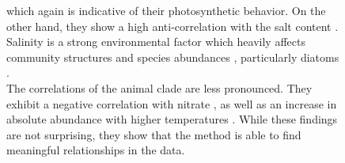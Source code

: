 \begin{figure}[hpbt]
{        which again is indicative of their photosynthetic behavior.
        On the other hand, they show a high anti-correlation
        with the salt content .
        Salinity is a strong environmental factor which heavily affects community structures
        and species abundances \cite{Lozupone2007}, particularly diatoms \cite{Potapova2011}.
        \\
        The correlations of the animal clade are less pronounced.
        They exhibit a negative correlation with nitrate ,
        as well as an increase in absolute abundance with higher temperatures .
        While these findings are not surprising,
        they show that the method is able to find meaningful relationships in the data.
    }
    \label{fig:tara_correlation}
\end{figure}
